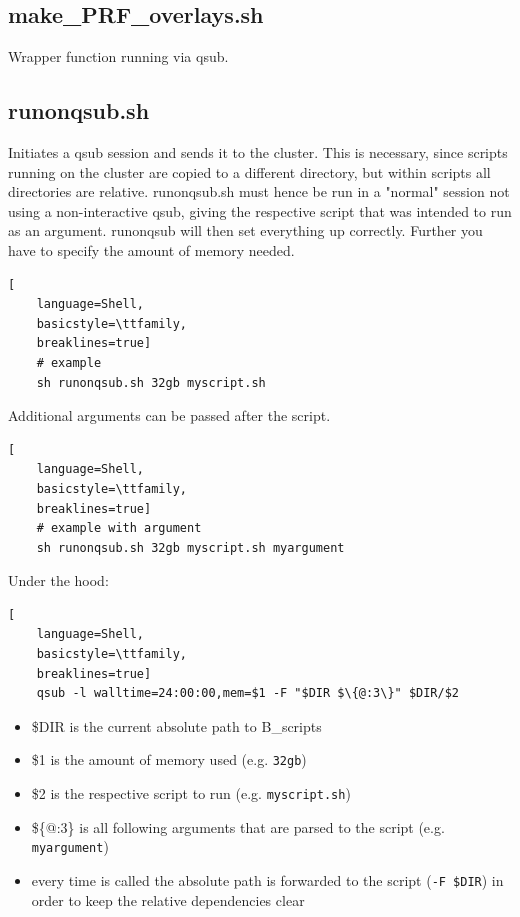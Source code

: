 \documentclass[12pt,a4paper]{scrartcl}
\begin{document}
\subsection{make\_PRF\_overlays.sh}
\label{sh:mkprfO}
Wrapper function running \texttt{} via qsub.\\

\subsection{runonqsub.sh}
\label{sh:runQsub}
Initiates a qsub session and sends it to the cluster. This is necessary, since scripts running on the cluster are copied to a different directory, but within scripts all directories are relative. runonqsub.sh must hence be run in a "normal" session not using a non-interactive qsub, giving the respective script that was intended to run as an argument. runonqsub will then set everything up correctly. Further you have to specify the amount of memory needed.
\begin{lstlisting}[
    language=Shell,
    basicstyle=\ttfamily,
    breaklines=true]
    # example
    sh runonqsub.sh 32gb myscript.sh
\end{lstlisting}

\noindent Additional arguments can be passed after the script.\\
\begin{lstlisting}[
    language=Shell,
    basicstyle=\ttfamily,
    breaklines=true]
    # example with argument
    sh runonqsub.sh 32gb myscript.sh myargument
\end{lstlisting}
\noindent Under the hood:
\begin{lstlisting}[
    language=Shell,
    basicstyle=\ttfamily,
    breaklines=true]
    qsub -l walltime=24:00:00,mem=$1 -F "$DIR $\{@:3\}" $DIR/$2
\end{lstlisting}
\begin{itemize}
\item \$DIR is the current absolute path to B\_scripts
\item \$1 is the amount of memory used (e.g. \texttt{32gb})
\item \$2 is the respective script to run (e.g. \texttt{myscript.sh})
\item \$\{@:3\} is all following arguments that are parsed to the script (e.g. \texttt{myargument})
\item every time \texttt{} is called the absolute path is forwarded to the script (\texttt{-F \$DIR}) in order to keep the relative dependencies clear
\end{itemize}
\end{document}
